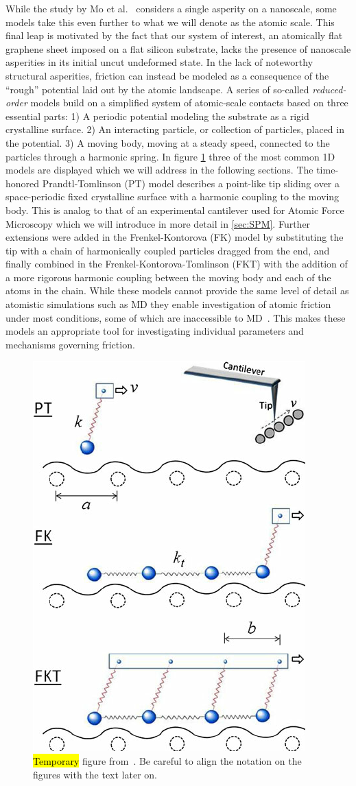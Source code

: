 While the study by Mo et al.~\cite{mo_friction_2009} considers a single
asperity on a nanoscale, some models take this even further to what we will
denote as the atomic scale. This final leap is motivated by the fact that our
system of interest, an atomically flat graphene sheet imposed on a flat silicon
substrate, lacks the presence of nanoscale asperities in its initial uncut
undeformed state. In the lack of noteworthy structural asperities, friction can
instead be modeled as a consequence of the ``rough'' potential laid out by
the atomic landscape. A series of so-called \textit{reduced-order} models build on a
simplified system of atomic-scale contacts based on three essential parts: 1) A
periodic potential modeling the substrate as a rigid crystalline surface. 2) An
interacting particle, or collection of particles, placed in the potential. 3) A
moving body, moving at a steady speed, connected to the particles through a
harmonic spring. In figure \cref{fig:PT_FK_FKT} three of the most common 1D
models are displayed which we will address in the following sections. The
time-honored Prandtl-Tomlinson (PT) model describes a point-like tip sliding
over a space-periodic fixed crystalline surface with a harmonic coupling to the
moving body. This is analog to that of an experimental cantilever used for
Atomic Force Microscopy which we will introduce in more detail in
\cref{sec:SPM}. Further extensions were added in the Frenkel-Kontorova
(\acrshort{FK}) model by substituting the tip with a chain of harmonically coupled
particles dragged from the end, and finally combined in the
Frenkel-Kontorova-Tomlinson (\acrshort{FKT}) with the addition of a more
rigorous harmonic coupling between the moving body and each of the atoms in the
chain. While these models cannot provide the same level of detail as atomistic
simulations such as \acrshort{MD} they enable investigation of atomic friction
under most conditions, some of which are inaccessible to \acrshort{MD}~\cite{Yalin_2011}. This makes these models an appropriate tool for investigating
individual parameters and mechanisms governing friction.


\begin{figure}[H]
  \centering
  \includegraphics[width=0.4\linewidth]{figures/theory/PT_FK_FKT.png}
  \caption{\hl{Temporary} figure from~\cite{Yalin_2011}. Be careful to align the notation on the figures with the text later on.}
  \label{fig:PT_FK_FKT}
\end{figure}



